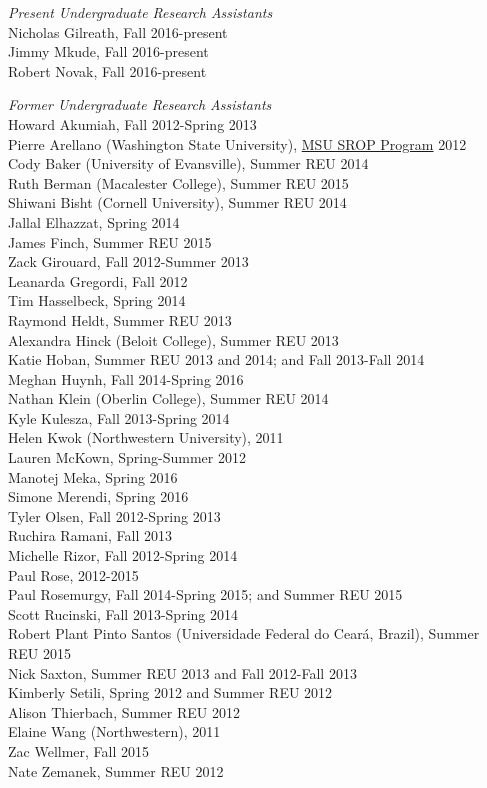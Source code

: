 \documentclass[9pt]{extarticle}
\begin{document}
\emph{Present Undergraduate Research Assistants} \\
Nicholas Gilreath, Fall 2016-present \\
Jimmy Mkude, Fall 2016-present \\
Robert Novak, Fall 2016-present

\emph{Former Undergraduate Research Assistants} \\
Howard Akumiah, Fall 2012-Spring 2013 \\
Pierre Arellano (Washington State University), \href{http://grad.msu.edu/srop/}{MSU SROP Program} 2012 \\
Cody Baker (University of Evansville), Summer REU 2014 \\
Ruth Berman (Macalester College), Summer REU 2015 \\
Shiwani Bisht (Cornell University), Summer REU 2014 \\
Jallal Elhazzat, Spring 2014 \\
James Finch, Summer REU 2015 \\
Zack Girouard, Fall 2012-Summer 2013 \\
Leanarda Gregordi, Fall 2012 \\
Tim Hasselbeck, Spring 2014 \\
Raymond Heldt, Summer REU 2013 \\
Alexandra Hinck (Beloit College), Summer REU 2013 \\
Katie Hoban, Summer REU 2013 and 2014; and Fall 2013-Fall 2014 \\
Meghan Huynh, Fall 2014-Spring 2016 \\
Nathan Klein (Oberlin College), Summer REU 2014 \\
Kyle Kulesza, Fall 2013-Spring 2014 \\
Helen Kwok (Northwestern University), 2011 \\
Lauren McKown, Spring-Summer 2012 \\
Manotej Meka, Spring 2016 \\
Simone Merendi, Spring 2016 \\
Tyler Olsen, Fall 2012-Spring 2013 \\
Ruchira Ramani, Fall 2013 \\
Michelle Rizor, Fall 2012-Spring 2014 \\
Paul Rose, 2012-2015 \\
Paul Rosemurgy, Fall 2014-Spring 2015; and Summer REU 2015 \\
Scott Rucinski, Fall 2013-Spring 2014 \\
Robert Plant Pinto Santos (Universidade Federal do Cear\'{a}, Brazil), Summer REU 2015 \\
Nick Saxton, Summer REU 2013 and Fall 2012-Fall 2013 \\
Kimberly Setili, Spring 2012 and Summer REU 2012 \\
Alison Thierbach, Summer REU 2012 \\
Elaine Wang (Northwestern), 2011 \\
Zac Wellmer, Fall 2015 \\
Nate Zemanek, Summer REU 2012 \\
\end{document}
